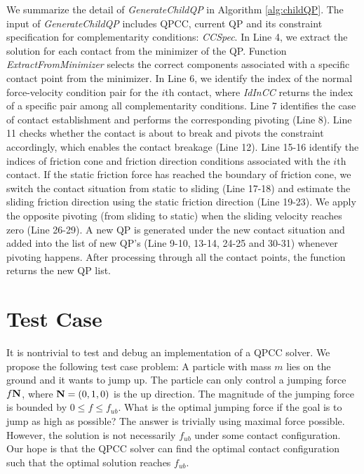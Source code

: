 We summarize the detail of \emph{GenerateChildQP} in Algorithm \ref{alg:childQP}. The input of \emph{GenerateChildQP} includes QPCC, current QP and its constraint specification for complementarity conditions: \emph{CCSpec}. In Line 4, we extract the solution for each contact from the minimizer of the QP. Function \emph{ExtractFromMinimizer} selects the correct components associated with a specific contact point from the minimizer. In Line 6, we identify the index of the normal force-velocity condition pair for the $i$th contact, where \emph{IdInCC} returns the index of a specific pair among all complementarity conditions. Line 7 identifies the case of contact establishment and performs the corresponding pivoting (Line 8). Line 11 checks whether the contact is about to break and pivots the constraint accordingly, which enables the contact breakage (Line 12). Line 15-16 identify the indices of friction cone and friction direction conditions associated with the $i$th contact. If the static friction force has reached the boundary of friction cone, we switch the contact situation from static to sliding (Line 17-18) and estimate the sliding friction direction using the static friction direction (Line 19-23). We apply the opposite pivoting (from sliding to static) when the
sliding velocity reaches zero (Line 26-29). A new QP is generated under the new contact situation and added into the list of new QP's (Line 9-10, 13-14, 24-25 and 30-31) whenever pivoting happens. After processing through all the contact points, the function returns the new QP list.

\section{Test Case}
It is nontrivial to test and debug an implementation of a QPCC solver. We propose the following test case problem: A particle with mass $m$ lies on the ground and it wants to jump up. The particle can only control a jumping force $f\mathbf{N}$, where $\mathbf{N}=(0, 1, 0)$ is the up direction. The magnitude of the jumping force is bounded by $0\leq f\leq f_{ub}$. What is the optimal jumping force if the goal is to jump as high as possible? The answer is trivially using maximal force possible. However, the solution is not necessarily $f_{ub}$ under some contact configuration. Our hope is that the QPCC solver can find the optimal contact configuration such that the optimal solution reaches $f_{ub}$.

